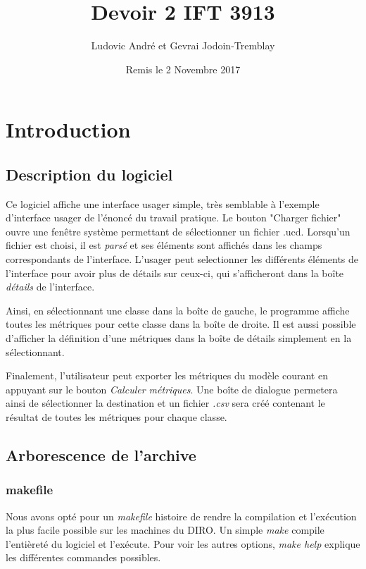 \documentclass[letter,french]{report}
\begin{document}
	\title{Devoir 2 IFT 3913}
	\author{Ludovic André et Gevrai Jodoin-Tremblay}
	\date{Remis le 2 Novembre 2017}
	\maketitle
	
	
  \section*{Introduction}

	\subsection*{Description du logiciel}
	Ce logiciel affiche une interface usager simple, très semblable
	à l'exemple d'interface usager de l'énoncé du travail pratique. Le bouton "Charger
	fichier" ouvre une fenêtre système permettant de sélectionner un fichier .ucd.
	Lorsqu'un fichier est choisi, il est \emph{parsé} et ses éléments sont affichés dans
	les champs correspondants de l'interface. L'usager peut selectionner les
  différents éléments de l'interface pour avoir plus de détails sur ceux-ci, qui
  s'afficheront dans la boîte \emph{détails} de l'interface.

  Ainsi, en sélectionnant une classe dans la boîte de gauche, le programme
  affiche toutes les métriques pour cette classe dans la boîte de droite. Il est
  aussi possible d'afficher la définition d'une métriques dans la boîte de
  détails simplement en la sélectionnant.

  Finalement, l'utilisateur peut exporter les métriques du modèle courant en
  appuyant sur le bouton \emph{Calculer métriques}. Une boîte de dialogue
  permetera ainsi de sélectionner la destination et un fichier \emph{.csv} sera
  créé contenant le résultat de toutes les métriques pour chaque classe.

  \subsection*{Arborescence de l'archive}
	\subsubsection*{makefile}
	Nous avons opté pour un \emph{makefile} histoire de rendre la compilation et l'exécution
	la plus facile possible sur les machines du DIRO. Un simple \emph{make} compile
	l'entièreté du logiciel et l'exécute. Pour voir les autres options, \emph{make help}
	explique les différentes commandes possibles.
\end{document}
